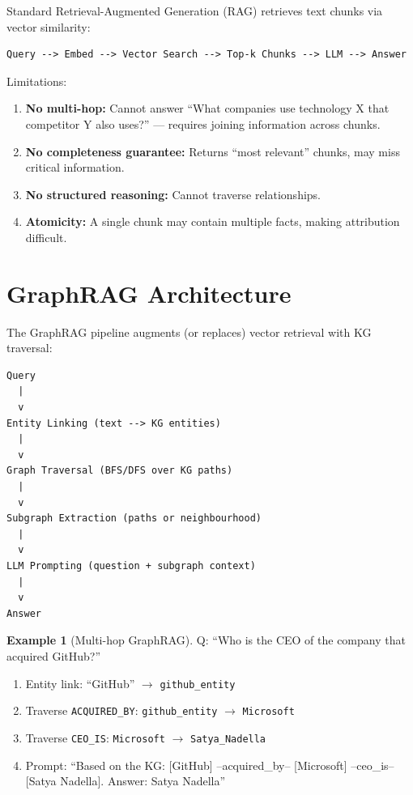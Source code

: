 \documentclass[11pt,a4paper,oneside,openany]{book}
\theoremstyle{definition}
\newtheorem{example}{Example}[chapter]
\theoremstyle{plain}
\theoremstyle{remark}
\begin{document}
Standard Retrieval-Augmented Generation (RAG) retrieves text chunks via vector similarity:

\begin{verbatim}
Query --> Embed --> Vector Search --> Top-k Chunks --> LLM --> Answer
\end{verbatim}

Limitations:
\begin{enumerate}
	\item \textbf{No multi-hop:} Cannot answer ``What companies use technology X that competitor Y also uses?'' --- requires joining information across chunks.
	\item \textbf{No completeness guarantee:} Returns ``most relevant'' chunks, may miss critical information.
	\item \textbf{No structured reasoning:} Cannot traverse relationships.
	\item \textbf{Atomicity:} A single chunk may contain multiple facts, making attribution difficult.
\end{enumerate}

\section{GraphRAG Architecture}\label{sec:graphrag-arch}

The GraphRAG pipeline augments (or replaces) vector retrieval with KG traversal:

\begin{verbatim}
Query
  |
  v
Entity Linking (text --> KG entities)
  |
  v
Graph Traversal (BFS/DFS over KG paths)
  |
  v
Subgraph Extraction (paths or neighbourhood)
  |
  v
LLM Prompting (question + subgraph context)
  |
  v
Answer
\end{verbatim}

\begin{example}[Multi-hop GraphRAG]
	Q: ``Who is the CEO of the company that acquired GitHub?''
	\begin{enumerate}
		\item Entity link: ``GitHub'' $\to$ \texttt{github\_entity}
		\item Traverse \texttt{ACQUIRED\_BY}: \texttt{github\_entity} $\to$ \texttt{Microsoft}
		\item Traverse \texttt{CEO\_IS}: \texttt{Microsoft} $\to$ \texttt{Satya\_Nadella}
		\item Prompt: ``Based on the KG: [GitHub] --acquired\_by-- [Microsoft] --ceo\_is-- [Satya Nadella]. Answer: Satya Nadella''
	\end{enumerate}
\end{example}
\end{document}
